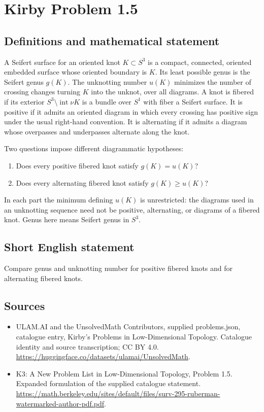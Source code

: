\documentclass[11pt,a4paper]{article}
\begin{document}
\section*{Kirby Problem 1.5}\label{statement}

\subsection{Definitions and mathematical statement}
A Seifert surface for an oriented knot $K\subset S^3$ is a compact, connected,
oriented embedded surface whose oriented boundary is $K$. Its least possible genus
is the Seifert genus $g(K)$. The unknotting number $u(K)$ minimizes the number of
crossing changes turning $K$ into the unknot, over all diagrams.
A knot is fibered if its exterior $S^3\setminus\operatorname{int}\nu K$ is a bundle
over $S^1$ with fiber a Seifert surface. It is positive if it admits an oriented
diagram in which every crossing has positive sign under the usual right-hand
convention. It is alternating if it admits a diagram whose overpasses and
underpasses alternate along the knot.

Two questions impose different diagrammatic hypotheses:
\begin{enumerate}
\item Does every positive fibered knot satisfy $g(K)=u(K)$?
\item Does every alternating fibered knot satisfy $g(K)\geq u(K)$?
\end{enumerate}
In each part the minimum defining $u(K)$ is unrestricted: the diagrams used in an
unknotting sequence need not be positive, alternating, or diagrams of a fibered
knot. Genus here means Seifert genus in $S^3$.
\subsection{Short English statement}
Compare genus and unknotting number for positive fibered knots and for alternating fibered knots.
\subsection{Sources}
\begin{itemize}
\item[S1] ULAM.AI and the UnsolvedMath Contributors, supplied problems.json, catalogue entry, Kirby's Problems in Low-Dimensional Topology. Catalogue identity and source transcription; CC BY 4.0.
\url{https://huggingface.co/datasets/ulamai/UnsolvedMath}.
\item[S2] K3: A New Problem List in Low-Dimensional Topology, Problem 1.5. Expanded formulation of the supplied catalogue statement.
\url{https://math.berkeley.edu/sites/default/files/surv-295-ruberman-watermarked-author-pdf.pdf}.
\end{itemize}
\end{document}
